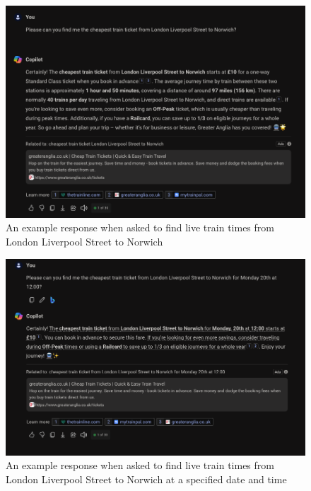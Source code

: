 \begin{figure}[!htbp]
    \centering
    \includegraphics[width=\textwidth]{Diagrams/LLM examples/Bing_Co-pilot_Train_ticket_request.png}
    \caption{An example response when asked to find live train times from London Liverpool Street to Norwich}
    \label{Fig: example of bing co-pilot}
\end{figure}

\begin{figure}[!htbp]
    \centering
    \includegraphics[width=\textwidth]{Diagrams/LLM examples/Bing_Co-pilot_Train_ticket_request_02.png}
    \caption{An example response when asked to find live train times from London Liverpool Street to Norwich at a specified date and time}
    \label{Fig: example of bing co-pilot revised}
\end{figure}

